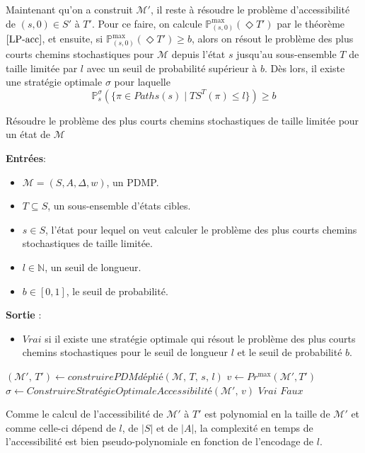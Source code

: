 \documentclass[12pt,a4paper]{report}
\theoremstyle{definition}%
\theoremstyle{remark}
\newcommand{\pr}{\mathbb{P}}
\let\labelitemi\labelitemii
\begin{document}
Maintenant qu'on a construit $\mathcal{M}'$, il reste à résoudre le problème
d'accessibilité de $(s, 0) \in S'$ à $T'$. Pour ce faire, on calcule
$\pr^{\max}_{(s, 0)}(\Diamond T')$ par le théorème $\ref{LP-acc}$, et ensuite, si $\pr^{\max}_{(s, 0)}(\Diamond T') \geq b$, alors on résout le
problème des plus courts chemins stochastiques pour $\mathcal{M}$ depuis
l'état $s$ jusqu'au sous-ensemble $T$ de taille limitée par $l$ avec un seuil de probabilité supérieur à $b$. Dès lors, il existe une stratégie
optimale $\sigma$ pour laquelle
\[\pr^\sigma_s(\{ \pi \in Paths(s) \; | \; TS^T(\pi) \leq l \}) \geq b\]

\begin{algorithm}[H]
\caption{Résoudre le problème des plus courts chemins stochastiques de taille limitée pour un état de $\mathcal{M}$}
\hspace*{\algorithmicindent} \textbf{Entrées}:
	\begin{itemize}
		\renewcommand{\labelitemi}{\tiny$\bullet$}
		\item $\mathcal{M} = (S, A, \Delta, w)$, un PDMP.
		\item $T \subseteq S$, un sous-ensemble d'états cibles.
		\item $s \in S$, l'état pour lequel on veut calculer le problème des plus
			courts chemins stochastiques de taille limitée.
		\item $l \in \mathbb{N}$, un seuil de longueur.
		\item $b \in [0, 1]$, le seuil de probabilité.
	\end{itemize}
\hspace*{\algorithmicindent} \textbf{Sortie} :
\begin{itemize}
	\renewcommand{\labelitemi}{\tiny$\bullet$}
	\item $Vrai$ si il existe une stratégie optimale qui résout le problème des plus courts chemins stochastiques pour le seuil de longueur $l$ et le seuil
	de probabilité $b$.
\end{itemize}
\begin{algorithmic}[1]
\STATE $(\mathcal{M}',\, T') \gets construirePDM\textit{déplié}(\mathcal{M}, \, T, \, s, \, l)$
\STATE $v \gets Pr^{\max}(\mathcal{M}', T')$ \\
	\STATE $\sigma \gets ConstruireStrat\textit{é}gieOptimaleAccessibilit\textit{é}(\mathcal{M}', \, v)$
	\RETURN $Vrai$
\ELSE
	\RETURN $Faux$
\ENDIF
\end{algorithmic}
\end{algorithm}
Comme le calcul de l'accessibilité de $\mathcal{M}'$ à $T'$ est polynomial en la taille de $\mathcal{M}'$ et comme celle-ci dépend de $l$, de $|S|$ et de
$|A|$, la complexité en temps de l'accessibilité est bien pseudo-polynomiale
en fonction de l'encodage de $l$.
\end{document}
